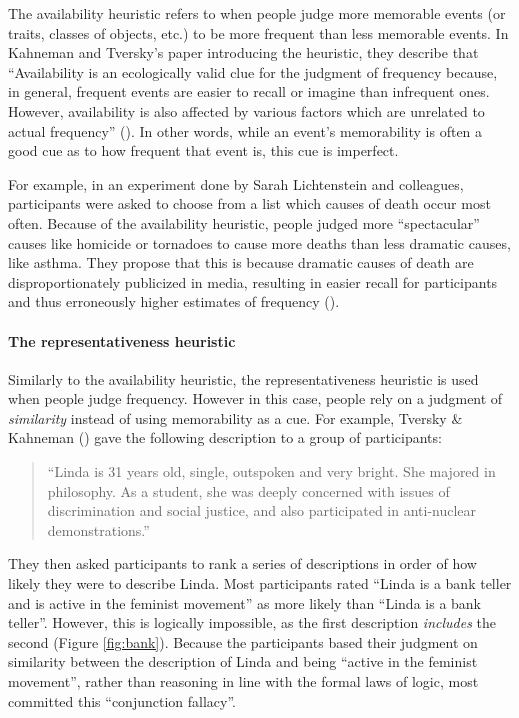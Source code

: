 \documentclass[
]{krantz}
\begin{document}
The availability heuristic refers to when people judge more memorable events (or traits, classes of objects, etc.) to be more frequent than less memorable events. In Kahneman and Tversky's paper introducing the heuristic, they describe that ``Availability is an ecologically valid clue for the judgment of frequency because, in general, frequent events are easier to recall or imagine than infrequent ones. However, availability is also affected by various factors which are unrelated to actual frequency'' (). In other words, while an event's memorability is often a good cue as to how frequent that event is, this cue is imperfect.

For example, in an experiment done by Sarah Lichtenstein and colleagues, participants were asked to choose from a list which causes of death occur most often. Because of the availability heuristic, people judged more ``spectacular'' causes like homicide or tornadoes to cause more deaths than less dramatic causes, like asthma. They propose that this is because dramatic causes of death are disproportionately publicized in media, resulting in easier recall for participants and thus erroneously higher estimates of frequency ().

\paragraph*{The representativeness heuristic}\label{the-representativeness-heuristic}

Similarly to the availability heuristic, the representativeness heuristic is used when people judge frequency. However in this case, people rely on a judgment of \emph{similarity} instead of using memorability as a cue. For example, Tversky \& Kahneman () gave the following description to a group of participants:

\begin{quote}
``Linda is 31 years old, single, outspoken and very bright. She majored in philosophy. As a student, she was deeply concerned with issues of discrimination and social justice, and also participated in anti-nuclear demonstrations.''
\end{quote}

They then asked participants to rank a series of descriptions in order of how likely they were to describe Linda. Most participants rated ``Linda is a bank teller and is active in the feminist movement'' as more likely than ``Linda is a bank teller''. However, this is logically impossible, as the first description \emph{includes} the second (Figure \ref{fig:bank}). Because the participants based their judgment on similarity between the description of Linda and being ``active in the feminist movement'', rather than reasoning in line with the formal laws of logic, most committed this ``conjunction fallacy''.
\end{document}
